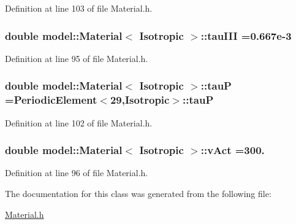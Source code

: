 Definition at line 103 of file Material.\+h.

\hypertarget{classmodel_1_1_material_3_01_isotropic_01_4_a3b332d99cc4ba74ddc5c400ff43cbec2}{}
\subsubsection[{tau\+I\+I\+I}]{\setlength{\rightskip}{0pt plus 5cm}double {\bf model\+::\+Material}$<$ {\bf Isotropic} $>$\+::tau\+I\+I\+I =0.\+667e-\/3\hspace{0.3cm}{\ttfamily [static]}}\label{classmodel_1_1_material_3_01_isotropic_01_4_a3b332d99cc4ba74ddc5c400ff43cbec2}


Definition at line 95 of file Material.\+h.

\hypertarget{classmodel_1_1_material_3_01_isotropic_01_4_acc8ff01baf092b274787d9b46b37dbab}{}
\subsubsection[{tau\+P}]{\setlength{\rightskip}{0pt plus 5cm}double {\bf model\+::\+Material}$<$ {\bf Isotropic} $>$\+::tau\+P ={\bf Periodic\+Element}$<$29,{\bf Isotropic}$>$\+::tau\+P\hspace{0.3cm}{\ttfamily [static]}}\label{classmodel_1_1_material_3_01_isotropic_01_4_acc8ff01baf092b274787d9b46b37dbab}


Definition at line 102 of file Material.\+h.

\hypertarget{classmodel_1_1_material_3_01_isotropic_01_4_afd8e7f004fd95d56ac69dcfd11e740be}{}
\subsubsection[{v\+Act}]{\setlength{\rightskip}{0pt plus 5cm}double {\bf model\+::\+Material}$<$ {\bf Isotropic} $>$\+::v\+Act =300.\hspace{0.3cm}{\ttfamily [static]}}\label{classmodel_1_1_material_3_01_isotropic_01_4_afd8e7f004fd95d56ac69dcfd11e740be}


Definition at line 96 of file Material.\+h.



The documentation for this class was generated from the following file\+:\begin{DoxyCompactItemize}
\item 
\hyperlink{_material_8h}{Material.\+h}\end{DoxyCompactItemize}
